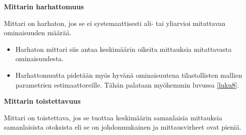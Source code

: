\documentclass[
]{book}
\begin{document}
\begin{defblock}{}
\textbf{Mittarin harhattomuus}

Mittari on harhaton, jos se ei systemaattisesti ali- tai yliarvioi mitattavan ominaisuuden määrää.

\end{defblock}

\begin{itemize}
\item
  Harhaton mittari siis antaa keskimäärin oikeita mittauksia mitattavasta ominaisuudesta.
\item
  Harhattomuutta pidetään myös hyvänä ominaisuutena tilastollisten mallien parametrien estimaattoreille. Tähän palataan myöhemmin luvussa \ref{luku8}.
\end{itemize}

\begin{defblock}{}
\textbf{Mittarin toistettavuus}

Mittari on toistettava, jos se tuottaa keskimäärin samanlaisia mittauksia samanlaisista otoksista eli se on johdonmukainen ja mittausvirheet ovat pieniä.

\end{defblock}
\end{document}

